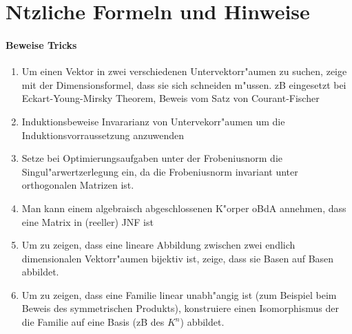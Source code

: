 \documentclass[8pt, a4paper, twocolumn, landscape]{article}
\begin{document}
 
\section{N\uee tzliche Formeln und Hinweise}
\paragraph{Beweise Tricks}
\begin{enumerate}
\item Um einen Vektor in zwei verschiedenen Untervektorr"aumen zu suchen, zeige mit der Dimensionsformel, dass sie sich schneiden m"ussen. zB eingesetzt bei Eckart-Young-Mirsky Theorem, Beweis vom Satz von Courant-Fischer
\item Induktionsbeweise Invararianz von Untervekorr"aumen um die Induktionsvorraussetzung anzuwenden
\item Setze bei Optimierungsaufgaben unter der Frobeniusnorm die Singul"arwertzerlegung ein, da die Frobeniusnorm invariant unter orthogonalen Matrizen ist.
\item Man kann einem algebraisch abgeschlossenen K"orper oBdA annehmen, dass eine Matrix in (reeller) JNF ist
\item Um zu zeigen, dass eine lineare Abbildung zwischen zwei endlich dimensionalen Vektorr"aumen bijektiv ist, zeige, dass sie Basen auf Basen abbildet.
\item Um zu zeigen, dass eine Familie linear unabh"angig ist (zum Beispiel beim Beweis des symmetrischen Produkts), konstruiere einen Isomorphismus der die Familie auf eine Basis (zB des $K^n$) abbildet.
\end{enumerate}
\end{document}
